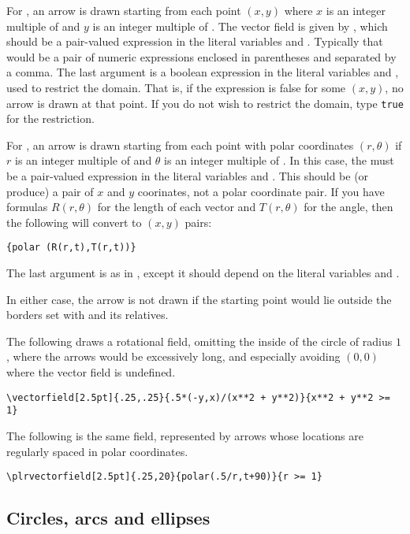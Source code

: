 \documentclass[letterpaper]{article}
\begin{document}
For , an arrow is drawn starting from each point $(x,y)$
where $x$ is an integer multiple of  and $y$ is an integer
multiple of . The vector field is given by ,
which should be a pair-valued expression in the literal variables
 and . Typically that would be a pair of numeric
expressions enclosed in parentheses and separated by a comma. The last
argument is a boolean expression in the literal variables  and
, used to restrict the domain. That is, if the expression is
false for some $(x,y)$, no arrow is drawn at that point. If you do not
wish to restrict the domain, type \texttt{true} for the restriction.

For , an arrow is drawn starting from each point with
polar coordinates $(r,\theta)$ if $r$ is an integer multiple of
 and $\theta$ is an integer multiple of . In this
case, the  must be a pair-valued expression in the literal
variables  and . This should be (or produce) a pair of $x$
and $y$ coorinates, not a polar coordinate pair. If you have formulas
$R(r,\theta)$ for the length of each vector and $T(r,\theta)$ for the
angle, then the following will convert to $(x,y)$ pairs:
\begin{verbatim}
{polar (R(r,t),T(r,t))}
\end{verbatim}
The last argument is as in , except it should depend on
the literal variables  and .

In either case, the arrow is not drawn if the starting point would lie
outside the borders set with  and its relatives.

The following draws a rotational field, omitting the inside of the
circle of radius $1$, where the arrows would be excessively long, and
especially avoiding $(0,0)$ where the vector field is undefined.
\begin{verbatim}
\vectorfield[2.5pt]{.25,.25}{.5*(-y,x)/(x**2 + y**2)}{x**2 + y**2 >= 1}
\end{verbatim}
The following is the same field, represented by arrows whose locations
are regularly spaced in polar coordinates.
\begin{verbatim}
\plrvectorfield[2.5pt]{.25,20}{polar(.5/r,t+90)}{r >= 1}
\end{verbatim}


\subsection{Circles, arcs and ellipses}\label{circles}
\end{document}
